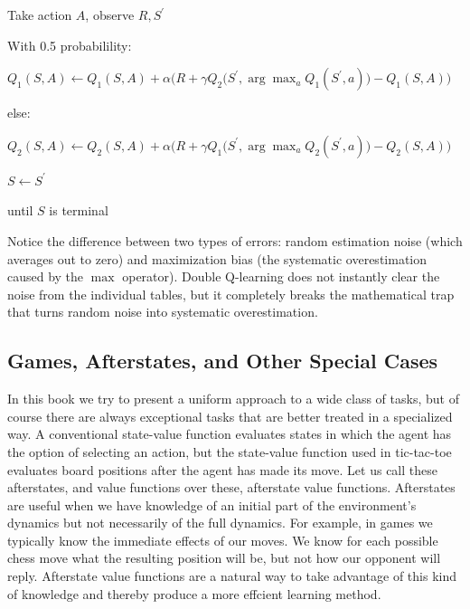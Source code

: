 \documentclass{article}
\begin{document}
\hspace{1cm} Take action $A$, observe $R ,   S ^ { \prime }$

\hspace{1cm} With 0.5 probabilility:

\hspace{1.5cm} $Q _ { 1 } ( S , A ) \leftarrow Q _ { 1 } ( S , A ) + \alpha \Big ( R + \gamma Q _ { 2 } \big ( S ^ { \prime } , \operatorname { a r g } \operatorname* { m a x } _ { a } Q _ { 1 } ( S ^ { \prime } , a ) \big ) - Q _ { 1 } ( S , A ) \Big )$

\hspace{1cm} else:

\hspace{1.5cm} $Q _ { 2 } ( S , A ) \leftarrow Q _ { 2 } ( S , A ) + \alpha \Big ( R + \gamma Q _ { 1 } \big ( S ^ { \prime } , \operatorname { a r g } \operatorname* { m a x } _ { a } Q _ { 2 } ( S ^ { \prime } , a ) \big ) - Q _ { 2 } ( S , A ) \Big )$

\hspace{1cm} $S \leftarrow S ^ { \prime }$

\hspace{.5cm} until $S$ is terminal

Notice the difference between two types of errors: random estimation noise (which averages out to zero) and maximization bias (the systematic overestimation caused by the \(\max \) operator).
Double Q-learning does not instantly clear the noise from the individual tables, but it completely breaks the mathematical trap that turns random noise into systematic overestimation.

\subsection{Games, Afterstates, and Other Special Cases}

In this book we try to present a uniform approach to a wide class of tasks, but of course there are always exceptional tasks that are better treated in a specialized way. 
A conventional state-value function evaluates states in which the agent has the option of selecting an action, but the state-value function used in
tic-tac-toe evaluates board positions after the agent has made its move. Let us call these afterstates, and value functions over these, afterstate value functions. 
Afterstates are useful when we have knowledge of an initial part of the environment's dynamics but not necessarily of the full dynamics. For example, in games we typically know the immediate effects of our moves. 
We know for each possible chess move what the resulting position will be, but not how our opponent will reply. Afterstate value functions are a natural way to take advantage of this kind of knowledge and thereby 
produce a more effcient learning method.
\end{document}
